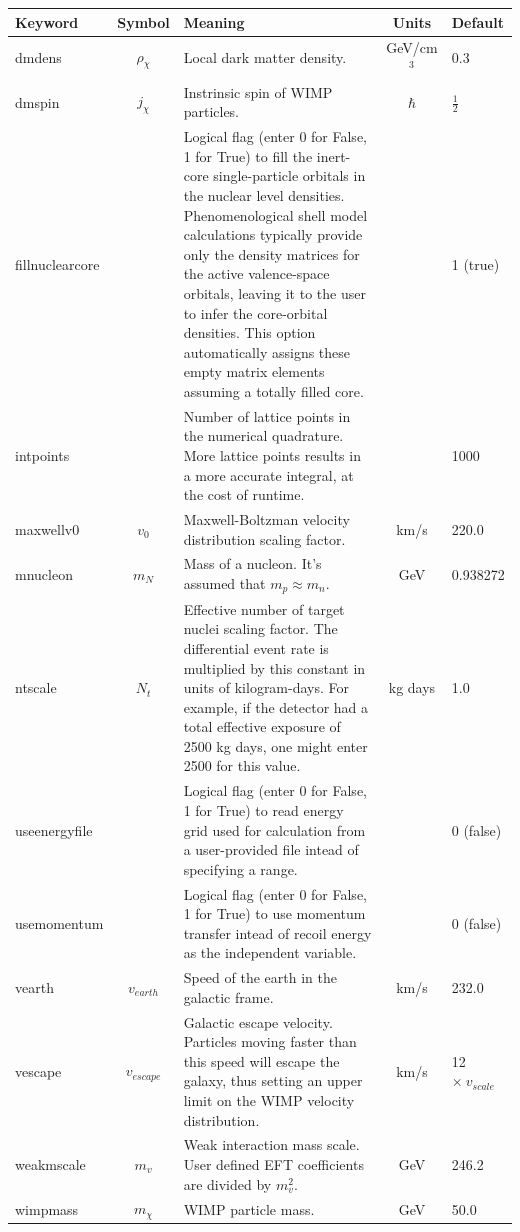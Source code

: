 \documentclass[12pt]{article}
\begin{document}
\begin{longtable}{| l | c | p{2.5in} | c | l | }
  \hline
  Keyword & Symbol & Meaning & Units & Default \\
  \hline
  dmdens & $\rho_\chi$ & Local dark matter density. & GeV/cm$^3$ & 0.3\\

  dmspin & $j_\chi$ & Instrinsic spin of WIMP particles. & $\hbar$ &
  $\frac{1}{2}$ \\

  fillnuclearcore & & Logical flag (enter 0 for False, 1 for True) to fill the
  inert-core single-particle orbitals in the nuclear level densities.
  Phenomenological shell model calculations typically provide only the density
  matrices for the active valence-space orbitals, leaving it to the user to
  infer the core-orbital densities. This option automatically assigns these
  empty matrix elements assuming a totally filled core. & & 1 (true)\\

  intpoints & & Number of lattice points in the numerical quadrature. More lattice
  points results in a more accurate integral, at the cost of runtime. & &
  1000\\

  maxwellv0 & $v_0$ & Maxwell-Boltzman velocity distribution scaling factor. &
  km/s & 220.0 \\

  mnucleon & $m_N$ & Mass of a nucleon. It's assumed that $m_p\approx m_n$. &
  GeV & 0.938272 \\

  ntscale & $N_t$ & Effective number of target nuclei scaling factor. The
  differential event rate is multiplied by this constant in units of
  kilogram-days. For example, if the detector had a total effective exposure of
  2500 kg days, one might enter 2500 for this value. & kg days & 1.0 \\

  useenergyfile & & Logical flag (enter 0 for False, 1 for True) to read energy
  grid used for calculation from a user-provided file intead of specifying a
  range. & & 0 (false) \\

  usemomentum & & Logical flag (enter 0 for False, 1 for True) to use momentum
  transfer intead of recoil energy as the independent variable. & &0 (false) \\

  vearth & $v_{earth}$ & Speed of the earth in the galactic frame. & km/s & 
  232.0\\

  vescape & $v_{escape}$ & Galactic escape velocity. Particles moving faster than
  this speed will escape the galaxy, thus setting an upper limit on the WIMP
  velocity distribution. & km/s & 12 $\times\ v_{scale}$ \\

  weakmscale & $m_v$ & Weak interaction mass scale. User defined EFT coefficients
  are divided by $m_v^2$. & GeV & 246.2 \\

  wimpmass & $m_\chi$ & WIMP particle mass. & GeV & 50.0\\
  \hline
\end{longtable}
\end{document}

